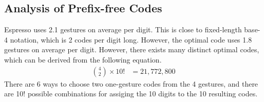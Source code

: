 \subsection{Analysis of Prefix-free Codes}
Espresso uses 2.1 gestures on average per digit. This is close to fixed-length base-4 notation, which is 2 codes per digit long. However, the optimal code uses 1.8 gestures on average per digit. However, there exists many distinct optimal codes, which can be derived from the following equation.
  \begin{align*}
    {4 \choose 2} \times 10! &= 21,772,800
  \end{align*}
There are 6 ways to choose two one-gesture codes from the 4 gestures, and there are 10! possible combinations for assiging the 10 digits to the 10 resulting codes.